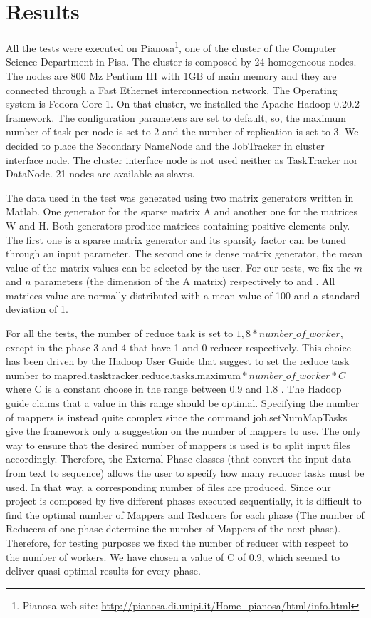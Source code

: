 \section{Results}
\label{results}

 All the tests were executed on Pianosa\footnote{Pianosa web site: \url{http://pianosa.di.unipi.it/Home_pianosa/html/info.html}}, one of the cluster of the Computer Science Department in Pisa. The cluster is composed by 24 homogeneous nodes. The nodes are 800 Mz Pentium III with 1GB of main memory and they are connected through a Fast Ethernet interconnection network. The Operating system is Fedora Core 1. On that cluster, we installed the Apache Hadoop 0.20.2 framework. The configuration parameters are set to default, so, the maximum number of task per node is set to 2 and the number of replication is set to 3. 
We decided to place the Secondary NameNode and the JobTracker in cluster interface node.
The cluster interface node is not used neither as TaskTracker nor DataNode.
21 nodes are available as slaves.

The data used in the test was generated using two matrix generators written in Matlab.
One generator for the sparse matrix A and another one for the matrices W and H. 
Both generators produce matrices containing positive elements only.
The first one is a sparse matrix generator and its sparsity factor can be tuned through an input parameter. 
The second one is dense matrix generator, the mean value of the matrix values can be selected by the user. 
For our tests, we fix the $m$ and $n$ parameters (the dimension of the A matrix) respectively to  and .
All matrices value are normally distributed with a mean value of 100 and a standard deviation of 1.

For all the tests, the number of reduce task is set to $ 1,8 * number\_of\_worker$, except in the phase 3 and 4 that have 1 and 0 reducer respectively.
This choice has been driven by the Hadoop User Guide that suggest to set the reduce task number to 
$ \text{mapred.tasktracker.reduce.tasks.maximum} * number\_of\_worker * C $where C is a constant choose in the range between 0.9 and 1.8 \cite{numeroReducer}. 
The Hadoop guide claims that a value in this range should be optimal.
Specifying the number of mappers is instead quite complex since the command job.setNumMapTasks give the framework only a suggestion on the number of mappers to use.
The only way to ensure that the desired number of mappers is used is to split input files accordingly. 
Therefore, the External Phase classes (that convert the input data from text to sequence) allows the user to specify how many reducer tasks must be used. 
In that way, a corresponding number of files are produced.
Since our project is composed by five different phases executed sequentially, it is difficult to find the optimal number of Mappers and Reducers for each phase (The number of Reducers of one phase determine the number of Mappers of the next phase). 
Therefore, for testing purposes we fixed the number of reducer with respect to the number of workers.
We have chosen a value of C of 0.9, which seemed to deliver quasi optimal results for every phase.

